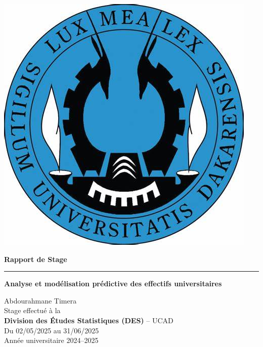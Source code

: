 \documentclass[12pt]{extarticle}
\begin{document}
\begin{tcolorbox}[colframe=myblue, colback=white, boxrule=1pt, arc=4pt, width=\textwidth, left=0pt, right=0pt, top=2pt, bottom=2pt]
\begin{minipage}{0.18\textwidth}
        \includegraphics[width=\textwidth]{image/ucad.jpg}
    \end{minipage}
\end{tcolorbox} 

\vspace{1cm}

\begin{center}
    {\fontsize{38}{44}\selectfont\bfseries Rapport de Stage}\\[1em]
    \color{myblue}\rule{0.6\textwidth}{3pt}
\end{center}

\vspace{1cm} 

\begin{center}
    {\fontsize{24}{24}\selectfont\bfseries Analyse et modélisation prédictive des effectifs universitaires}\\[1em]
\end{center}

\vspace{1cm} 

\begin{center}
    {\fontsize{20}{24}\selectfont Abdourahmane Timera}\\[1em]
    {\fontsize{16}{20}\selectfont
        Stage effectué à la\\
        \textbf{Division des Études Statistiques (DES)} – UCAD\\[0.8em]
        Du 02/05/2025 au 31/06/2025\\[0.8em]
        Année universitaire 2024–2025
    }
\end{center}
\end{document}
